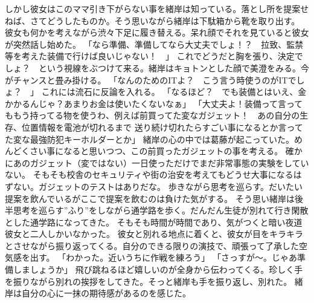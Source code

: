 \documentclass[uplatex]{utbook}
\begin{document}
しかし彼女はこのママ引き下がらない事を緒岸は知っている。落とし所を提案せねば、さてどうしたものか。そう思いながら緒岸は下駄箱から靴を取り出す。
彼女も何かを考えながら渋々下足に履き替える。呆れ顔でそれを見ていると彼女が突然話し始めた。
「なら準備、準備してなら大丈夫でしょ！？　拉致、監禁等を考えた装備で行けば良いじゃない！　」
これでどうだと胸を張り、決定でしょ？　という視線をぶつけて来る。緒岸はキョトンとした顔で美澄をみる。今がチャンスと畳み掛ける。
「なんのためのITよ？　こう言う時使うのがITでしょ？　」
これには流石に反論を入れる。
「なるほど？　でも装備とはいえ、金かかるんじゃ？あまりお金は使いたくないなぁ」
「大丈夫よ！装備って言ってももう持ってる物を使うわ、例えば前買ってた変なガジェット！　あの自分の生存、位置情報を電池が切れるまで
送り続け切れたらすごい事になるとか言ってた変な最強防犯キーホルダーとか」
緒岸の心の中では葛藤が起こっていた。めんどくさい事になると思いつつ、この前買ったガジェットの事を考える。
確かにあのガジェット（変ではない）一日使っただけでまだ非常事態の実験をしていない。
そもそも校舎のセキュリティや街の治安を考えてもどうせ大事になるはずない。ガジェットのテストはありだな。
歩きながら思考を巡らす。だいたい提案を飲んでいるがここで提案を飲むのは負けた気がする。
そう思い緒岸は後半思考を巡らす”ふり”をしながら通学路を歩く。だんだん生徒が別れて行き閑散とした通学路になってきた。
そもそも時間が時間であり、気がつくと暗い夜道彼女と二人しかいなかった。
彼女と別れる地点に着くと、彼女が目をキラキラとさせながら振り返ってくる。自分のできる限りの演技で、頑張って了承した空気感を出す。
「わかった。近いうちに作戦を練ろう」
「さっすが〜。じゃあ準備しましょうか」
飛び跳ねるほど嬉しいのが全身から伝わってくる。珍しく手を振りながら別れの挨拶をしてきた。そっと緒岸も手を振り返し、別れた。
緒岸は自分の心に一抹の期待感があるのを感じた。
\end{document}

